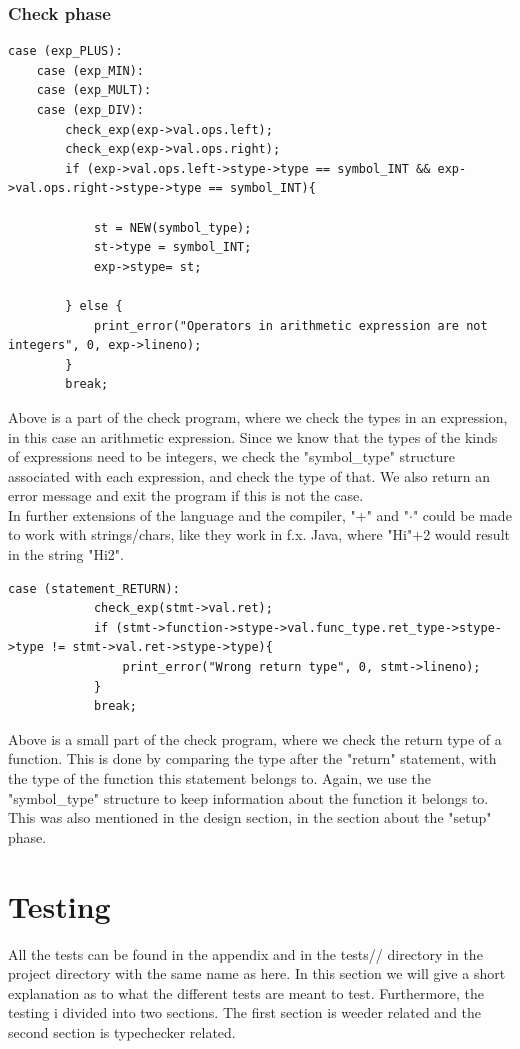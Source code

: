 \documentclass[a4paper,10pt,titlepage]{report}
\begin{document}
\subsubsection{Check phase}
\begin{lstlisting}
case (exp_PLUS):        
    case (exp_MIN):
    case (exp_MULT):        
    case (exp_DIV):
        check_exp(exp->val.ops.left);
        check_exp(exp->val.ops.right);
        if (exp->val.ops.left->stype->type == symbol_INT && exp->val.ops.right->stype->type == symbol_INT){
        
            st = NEW(symbol_type);
            st->type = symbol_INT;
            exp->stype= st;
            
        } else {
            print_error("Operators in arithmetic expression are not integers", 0, exp->lineno);
        }
        break;
\end{lstlisting}
Above is a part of the check program, where we check the types in an expression, in this case an arithmetic expression. Since we know that the types of the kinds of expressions need to be integers, we check the "symbol\_type" structure associated with each expression, and check the type of that. We also return an error message and exit the program if this is not the case.\\
In further extensions of the language and the compiler, "+" and "$\cdot$" could be made to work with strings/chars, like they work in f.x. Java, where "Hi"+2 would result in the string "Hi2".
\begin{lstlisting}
case (statement_RETURN):
            check_exp(stmt->val.ret);
            if (stmt->function->stype->val.func_type.ret_type->stype->type != stmt->val.ret->stype->type){
                print_error("Wrong return type", 0, stmt->lineno);
            }
            break;
\end{lstlisting}
Above is a small part of the check program, where we check the return type of a function. This is done by comparing the type after the "return" statement, with the type of the function this statement belongs to. Again, we use the "symbol\_type" structure to keep information about the function it belongs to. This was also mentioned in the design section, in the section about the "setup" phase.

\section{Testing}
All the tests can be found in the appendix and in the \textsf{tests/}/ directory in the project directory with the same name as here. In this section we will give a short explanation as to what the different tests are meant to test. Furthermore, the testing i divided into two sections. The first section is weeder related and the second section is typechecker related.
\end{document}
